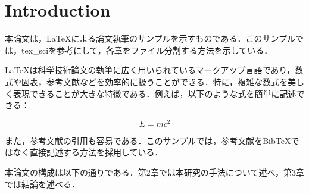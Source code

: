 \section{Introduction}

本論文は，LaTeXによる論文執筆のサンプルを示すものである．このサンプルでは，tex\_sciを参考にして，各章をファイル分割する方法を示している．

LaTeXは科学技術論文の執筆に広く用いられているマークアップ言語であり，数式や図表，参考文献などを効率的に扱うことができる．特に，複雑な数式を美しく表現できることが大きな特徴である．例えば，以下のような式を簡単に記述できる：

\begin{equation}
E = mc^2
\end{equation}

また，参考文献の引用も容易である\cite{Sample2025}．このサンプルでは，参考文献をBibTeXではなく直接記述する方法を採用している．

本論文の構成は以下の通りである．第2章では本研究の手法について述べ，第3章では結論を述べる．
